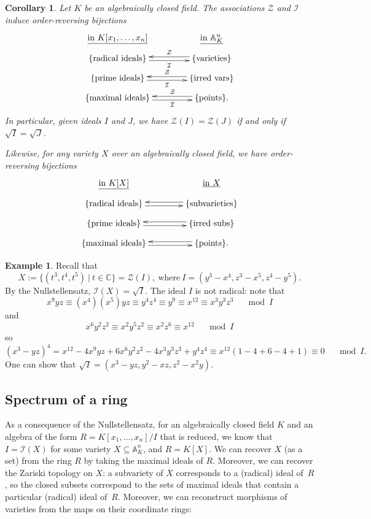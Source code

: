 \documentclass{amsart}[12pt]
\newcommand{\A}{\mathbb{A}}
\newcommand{\C}{\mathbb{C}}
\newcommand{\cZ}{\mathcal{Z}}
\newcommand{\cI}{\mathcal{I}}
\numberwithin{equation}{section}
\theoremstyle{plain} %
\newtheorem{corollary}[equation]{Corollary}
\theoremstyle{definition}
\newtheorem{ex}[equation]{Example}
\theoremstyle{remark}
\newcommand{\ssec}[1]{\subsection{#1}}
\begin{document}
\begin{corollary}\label{ord-pres-bij}
	Let $K$ be an algebraically closed field. The associations $\cZ$ and $\cI$ induce order-reversing bijections
	\[ \xymatrix@R=.7em@C=4em{ \text{\underline{in $K[x_1,\dots,x_n]$}} &  \text{\underline{in $\A^n_K$}}  \\
\{\text{radical ideals}\} \ar@<-.5ex>[r]_-{\cI} & \ar@<-.5ex>[l]_-{\cZ} \{\text{varieties} \} \\
\{\text{prime ideals}\} \ar@<-.5ex>[r]_-{\cI} & \ar@<-.5ex>[l]_-{\cZ} \{\text{irred vars} \} \\
\{\text{maximal ideals}\} \ar@<-.5ex>[r]_-{\cI} & \ar@<-.5ex>[l]_-{\cZ}  \{\text{points} \}. }\]
 In particular, given ideals $I$ and $J$, we have $\mathcal{Z}(I) = \mathcal{Z}(J)$ if and only if $\sqrt{I}=\sqrt{J}$.

 Likewise, for any variety $X$ over an algebraically closed  field, we have order-reversing bijections
\[ \xymatrix@R=.7em@C=4em{ \text{\underline{in $K[X]$}} &  \text{\underline{in $X$}}  \\
\{\text{radical ideals}\} \ar@<-.5ex>[r] & \ar@<-.5ex>[l] \{\text{subvarieties} \} \\
\{\text{prime ideals}\} \ar@<-.5ex>[r] & \ar@<-.5ex>[l]  \{\text{irred subs} \} \\
\{\text{maximal ideals}\} \ar@<-.5ex>[r] & \ar@<-.5ex>[l]  \{\text{points} \}. }\]
	\end{corollary}



\begin{ex} Recall that
\[ X:= \{ (t^3,t^4,t^5) \ | \ t\in \C \} = \cZ(I), \ \text{where} \ I=(y^3-x^4,z^3-x^5,z^4-y^5).\]
By the Nullstellensatz, $\cI(X) = \sqrt{I}$. The ideal $I$ is not radical: 
note that 
\[ x^9 yz \equiv (x^4)(x^5)yz \equiv y^4 z^4 \equiv y^9 \equiv x^{12} \equiv x^3 y^3 z^3 \quad \mod I\]
and
\[ x^6 y^2 z^2 \equiv x^2 y^5 z^2 \equiv x^2 z^6 \equiv x^{12}  \quad \mod I\]
so
\[ (x^3-yz)^4 = x^{12} - 4 x^9 yz + 6 x^6 y^2 z^2 - 4 x^3 y^3 z^3 + y^4 z^4 \equiv x^{12} ( 1 - 4 + 6 - 4 +1) \equiv 0  \quad \mod I.\]
One can show that $\sqrt{I}=(x^3-yz,y^2-xz,z^2-x^2y)$.
\end{ex}


\ssec{Spectrum of a ring}

As a consequence of the Nullstellensatz, for an algebraically closed field $K$ and an algebra of the form $R=K[x_1,\dots,x_n]/I$ that is reduced, we know that $I=\cI(X)$ for some variety $X\subseteq \A^n_K$, and $R=K[X]$. We can recover $X$ (as a set) from the ring $R$ by taking the maximal ideals of $R$. Moreover, we can recover the Zariski topology on $X$: a subvariety of $X$ corresponds to a (radical) ideal of~$R$, so the closed subsets correspond to the sets of maximal ideals that contain a particular (radical) ideal of~$R$. Moreover, we can reconstruct morphisms of varieties from the maps on their coordinate rings:
\end{document}
